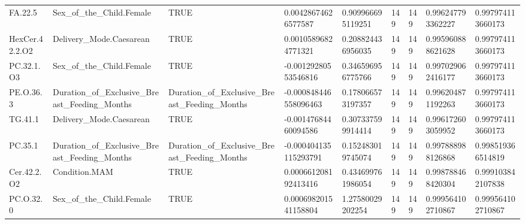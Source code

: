 \begin{longtable}{lllllllll}
FA.22.5 & Sex\_of\_the\_Child.Female & TRUE & 0.00428674626577587 & 0.909966695119251 & 149 & 149 & 0.996247793362227 & 0.997974113660173 \\
HexCer.42.2.O2 & Delivery\_Mode.Caesarean & TRUE & 0.00105896824771321 & 0.208824436956035 & 149 & 149 & 0.995960888621628 & 0.997974113660173 \\
PC.32.1.O3 & Sex\_of\_the\_Child.Female & TRUE & -0.00129280553546816 & 0.346596956775766 & 149 & 149 & 0.997029062416177 & 0.997974113660173 \\
PE.O.36.3 & Duration\_of\_Exclusive\_Breast\_Feeding\_Months & Duration\_of\_Exclusive\_Breast\_Feeding\_Months & -0.000848446558096463 & 0.178066573197357 & 149 & 149 & 0.996204871192263 & 0.997974113660173 \\
TG.41.1 & Delivery\_Mode.Caesarean & TRUE & -0.00147684460094586 & 0.307337599914414 & 149 & 149 & 0.996172603059952 & 0.997974113660173 \\
PC.35.1 & Duration\_of\_Exclusive\_Breast\_Feeding\_Months & Duration\_of\_Exclusive\_Breast\_Feeding\_Months & -0.000404135115293791 & 0.152483019745074 & 149 & 149 & 0.997888988126868 & 0.998519366514819 \\
Cer.42.2.O2 & Condition.MAM & TRUE & 0.000661208192413416 & 0.434699761986054 & 149 & 149 & 0.998788468420304 & 0.999103842107838 \\
PC.O.32.0 & Sex\_of\_the\_Child.Female & TRUE & 0.000698201541158804 & 1.27580029202254 & 149 & 149 & 0.999564102710867 & 0.999564102710867 \\
\end{longtable}
